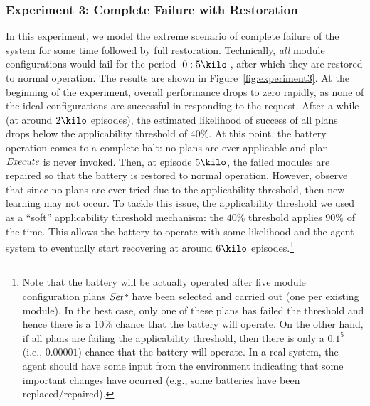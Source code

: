 %

\subsubsection{Experiment 3: Complete Failure with Restoration}

In this experiment, we model the extreme scenario of complete failure of the system for some time followed by full restoration. 
Technically, \emph{all} module configurations would fail for the period $[0:5\kilo]$, after which they are restored to normal operation.  
The results are shown in Figure~\ref{fig:experiment3}. 
At the beginning of the experiment, overall performance drops to zero rapidly, as none of the ideal configurations are successful in responding to the request. After a while (at around $2\kilo$ episodes), the estimated likelihood of success of all plans drops below the applicability threshold of $40\%$. At this point, the battery operation comes to a complete halt: no plans are ever applicable and plan $\operatorname{\textit{Execute}}$ is never invoked. 
Then, at episode $5\kilo$, the failed modules are repaired so that the battery is restored to normal operation. However, observe that since no plans are ever tried due to the applicability threshold, then new learning may not occur. To tackle this issue, the applicability threshold we used as a ``soft'' applicability threshold mechanism: the $40\%$ threshold applies $90\%$ of the time. This allows the battery to operate with some likelihood and the agent system to eventually start recovering at around $6\kilo$ episodes.\footnote{Note that the battery will be actually operated after five module configuration plans $\operatorname{\textit{Set*}}$ have been selected and carried out (one per existing module). In the best case, only one of these plans has failed the threshold and hence there is a $10\%$ chance that the battery will operate. On the other hand, if all plans are failing the applicability threshold, then there is only a $0.1^5$ (i.e.,  $0.00001$) chance that the battery will operate. In a real system, the agent should have some input from the environment indicating that some important changes have ocurred (e.g., some batteries have been replaced/repaired).}




